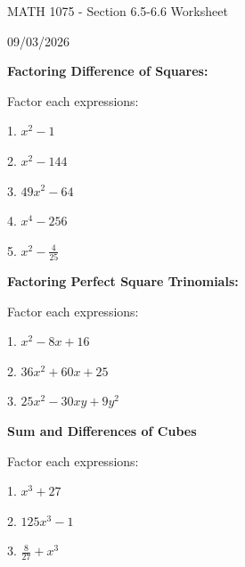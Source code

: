 \documentclass[12pt]{article}
\begin{document}
\vspace*{0.5in}

\begin{center}
    {\LARGE MATH 1075 - Section 6.5-6.6 Worksheet}

    \vspace{2em}

    {\large 09/03/2026}
\end{center}

\vspace{2em}

\textbf{\large Factoring Difference of Squares:}


\vspace{1.5em}

Factor each expressions:

\vspace{1.5em}

1. $x^{2}-1$

\vspace{4.5em}

2. $x^{2}-144$

\vspace{4.5em}

3. $49x^{2}-64$

\vspace{4.5em}

4. $x^{4}-256$

\vspace{4.5em}

5. $x^{2}-\frac{4}{25} $

\newpage

\textbf{\large Factoring Perfect Square Trinomials:}

\vspace{1.5em}

Factor each expressions:

\vspace{1.5em}

1. $x^{2}-8x+16$

\vspace{4.5em}

2. $36x^{2}+60x+25$

\vspace{4.5em}

3. $25x^{2}-30xy+9y^{2}$


\vspace{4.5em}

\textbf{\large Sum and Differences of Cubes}

\vspace{1.5em}

Factor each expressions:

\vspace{1.5em}

1. $x^{3}+27$

\vspace{4.5em}

2. $125x^{3}-1$

\vspace{4.5em}

3. $\frac{8}{27}+x^{3}$
\end{document}
